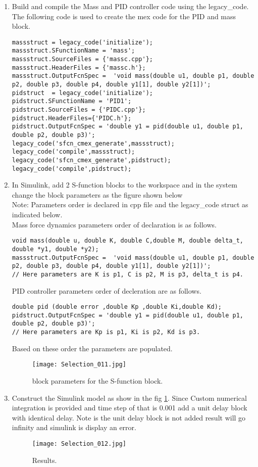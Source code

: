 \documentclass{article}
\begin{document}
\begin{enumerate}
    \item Build and compile the Mass and PID controller code using the legacy\_code. 
    The following code is used to create the mex code for the PID and mass block.
    \begin{verbatim}
massstruct = legacy_code('initialize');
massstruct.SFunctionName = 'mass';
massstruct.SourceFiles = {'massc.cpp'};
massstruct.HeaderFiles = {'massc.h'};
massstruct.OutputFcnSpec =  'void mass(double u1, double p1, double p2, double p3, double p4, double y1[1], double y2[1])';
pidstruct  = legacy_code('initialize');
pidstruct.SFunctionName = 'PID1';
pidstruct.SourceFiles = {'PIDC.cpp'};
pidstruct.HeaderFiles={'PIDC.h'};
pidstruct.OutputFcnSpec = 'double y1 = pid(double u1, double p1, double p2, double p3)';
legacy_code('sfcn_cmex_generate',massstruct);
legacy_code('compile',massstruct);
legacy_code('sfcn_cmex_generate',pidstruct);
legacy_code('compile',pidstruct);
    \end{verbatim}
    \item In Simulink, add 2 S-function blocks to the workspace and in the system change the block parameters as the figure shown below\\
    Note: Parameters order is declared in cpp file and the legacy\_code struct as indicated below.
    \\Mass force dynamics parameters order of declaration is as follows.
    \begin{verbatim}
void mass(double u, double K, double C,double M, double delta_t, double *y1, double *y2);
massstruct.OutputFcnSpec =  'void mass(double u1, double p1, double p2, double p3, double p4, double y1[1], double y2[1])';
// Here parameters are K is p1, C is p2, M is p3, delta_t is p4.
    \end{verbatim}
    
    PID controller parameters order of decleration are as follows.
    \begin{verbatim}
double pid (double error ,double Kp ,double Ki,double Kd);
pidstruct.OutputFcnSpec = 'double y1 = pid(double u1, double p1, double p2, double p3)';
// Here parameters are Kp is p1, Ki is p2, Kd is p3.
    \end{verbatim}
    Based on these order the parameters are populated. 
    \begin{figure}[H]
        \centering
        \texttt{[image: Selection\_011.jpg]}
        \caption{block parameters for the S-function block.}
    \end{figure}
    \item Construct the Simulink model as show in the fig \ref{fig:fig4}. Since Custom numerical integration is provided and time step of that is 0.001 add a unit delay block with identical delay. Note is the unit delay block is not added result will go infinity and simulink is display an error.
    \begin{figure}[H]
        \centering
        \texttt{[image: Selection\_012.jpg]}
        \caption{Results.}
        \label{fig:fig4}
    \end{figure}
\end{enumerate}
\end{document}
